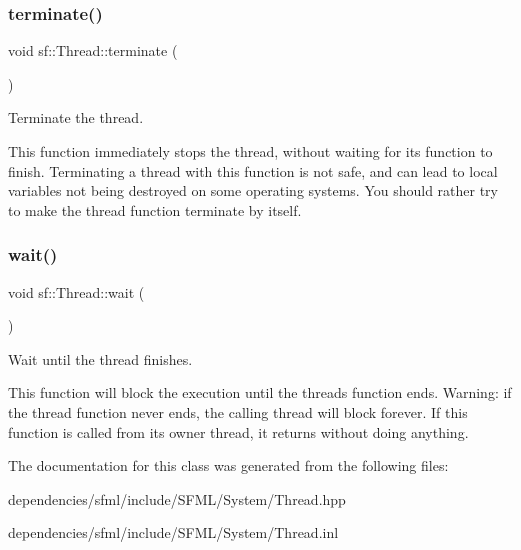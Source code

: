 \subsubsection{\texorpdfstring{terminate()}{terminate()}}
{\footnotesize\ttfamily void sf\+::\+Thread\+::terminate (\begin{DoxyParamCaption}{ }\end{DoxyParamCaption})}



Terminate the thread. 

This function immediately stops the thread, without waiting for its function to finish. Terminating a thread with this function is not safe, and can lead to local variables not being destroyed on some operating systems. You should rather try to make the thread function terminate by itself. \mbox{\label{classsf_1_1_thread_a724b1f94c2d54f84280f2f78bde95fa0}} 
\subsubsection{\texorpdfstring{wait()}{wait()}}
{\footnotesize\ttfamily void sf\+::\+Thread\+::wait (\begin{DoxyParamCaption}{ }\end{DoxyParamCaption})}



Wait until the thread finishes. 

This function will block the execution until the thread\textquotesingle{}s function ends. Warning\+: if the thread function never ends, the calling thread will block forever. If this function is called from its owner thread, it returns without doing anything. 

The documentation for this class was generated from the following files\+:\begin{DoxyCompactItemize}
\item 
dependencies/sfml/include/\+S\+F\+M\+L/\+System/Thread.\+hpp\item 
dependencies/sfml/include/\+S\+F\+M\+L/\+System/Thread.\+inl\end{DoxyCompactItemize}
